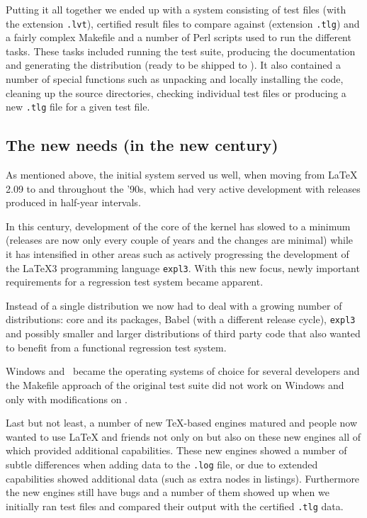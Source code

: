 \documentclass[final]{ltugboat}
\begin{document}
Putting it all together we ended up with a system consisting of
test files (with the extension \texttt{.lvt}), certified result files
to compare against (extension \texttt{.tlg}) and a fairly complex
Makefile and a number of Perl scripts used to run the different
tasks. These tasks included running the test suite, producing the
documentation and generating the distribution (ready to be shipped to
\CTAN). It also contained a number of special functions such as
unpacking and locally installing the code, cleaning up the source
directories, checking individual test files or producing a new
\texttt{.tlg} file for a given test file.


\subsection{The new needs (in the new century)}

As mentioned above, the initial system served us well, when moving
from \LaTeX\,2.09 to \LaTeXe{} and throughout the '90s, which
had very active \LaTeXe{} development with releases produced in
half-year intervals.

In this century, development of the core of the \LaTeXe{} kernel has slowed
to a minimum (releases are now only every couple of years and the
changes are minimal) while it has intensified in other areas such as
actively progressing the development of the \LaTeX3 programming
language \texttt{expl3}. With this new focus, newly important requirements for a
regression test system became apparent.

Instead of a single distribution we now had to deal with a growing
number of distributions: core \LaTeXe{} and its packages, Babel (with
a different release cycle), \texttt{expl3} and possibly smaller and
larger distributions of third party code that also wanted to benefit
from a functional regression test system.

Windows and \MacOSX\ became the operating systems of choice for several
developers and the Makefile approach of the original test suite did not
work on Windows and only with modifications on \MacOSX.

Last but not least, a number of new \TeX-based engines matured and people
now wanted to use \LaTeX{} and friends not only on \pdfTeX{} but also
on these new engines all of which provided additional capabilities.
These new engines showed a number of subtle differences when adding
data to the \texttt{.log} file, or due to extended capabilities showed
additional data (such as extra nodes in listings). Furthermore the new
engines still have bugs and a number of them showed up when we
initially ran test files and compared their output with the certified
\texttt{.tlg} data.
\end{document}

